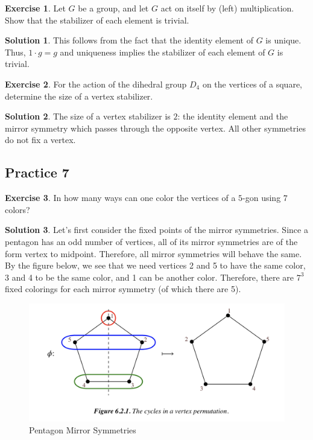 \documentclass[12pt]{article}
\theoremstyle{definition}
\newtheorem{exercise}{\color{YellowOrange}Exercise}
\theoremstyle{definition}
\newtheorem{solution}{\color{Goldenrod}Solution}
\begin{document}
\begin{exercise}
Let $G$ be a group, and let $G$ act on itself by (left) multiplication. Show that the stabilizer of each element is trivial.
\end{exercise}
\begin{solution}
This follows from the fact that the identity element of $G$ is unique. Thus, $1 \cdot g = g$ and uniqueness implies the stabilizer of each element of $G$ is trivial. 
\end{solution}

\begin{exercise}
For the action of the dihedral group $D_4$ on the vertices of a square, determine the size of a vertex stabilizer. 
\end{exercise}
\begin{solution}
The size of a vertex stabilizer is $2$: the identity element and the mirror symmetry which passes through the opposite vertex. All other symmetries do not fix a vertex. 
\end{solution}

\subsection{Practice 7}
\begin{exercise}
In how many ways can one color the vertices of a $5$-gon using $7$ colors?
\end{exercise}
\begin{solution}
Let's first consider the fixed points of the mirror symmetries. Since a pentagon has an odd number of vertices, all of its mirror symmetries are of the form vertex to midpoint. Therefore, all mirror symmetries will behave the same. By the figure below, we see that we need vertices 2 and 5 to have the same color, 3 and 4 to be the same color, and 1 can be another color. Therefore, there are $7^3$ fixed colorings for each mirror symmetry (of which there are 5). 
\begin{figure}[H]
	\begin{center}
		\includegraphics[scale=.6]{pentagon_permutation}
	\end{center}
	\caption{Pentagon Mirror Symmetries}
\end{figure}
\end{solution}
\end{document}
